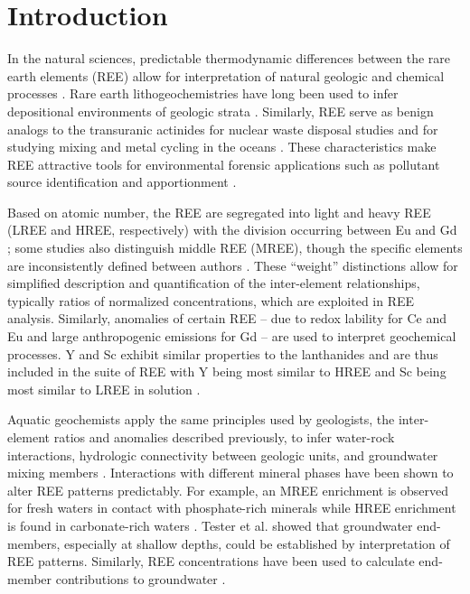 \section{Introduction}

In the natural sciences, predictable thermodynamic differences between the rare earth elements (REE) allow for interpretation of natural geologic and chemical processes \citep{REE_dep_study, REE_soil_tracers}. 
Rare earth lithogeochemistries have long been used to infer depositional environments of geologic strata \citep{REE_dep_study, PAAS, Hanson_EPS_1980}.
Similarly, REE serve as benign analogs to the transuranic actinides for nuclear waste disposal studies \citep{Krauskopf_CG_1986, Millero_GCA_1992} and for studying mixing and metal cycling in the oceans \citep{DeBaar_Nat_1983, Elderfield_PTRS_1988}.
These characteristics make REE attractive tools for environmental forensic applications such as pollutant source identification and apportionment \citep{Kulkarni_AE_2006, Kulkarni_EST_2007}.

Based on atomic number, the REE are segregated into light and heavy REE (LREE and HREE, respectively) with the division occurring between Eu and Gd \citep{Castor_Hedrick};
some studies also distinguish middle REE (MREE), though the specific elements are inconsistently defined between authors \citep{Hannigan_CG_2001, Tang_CG_2010, Choi_CG_2009, Brookins_RMG_1989}.
These ``weight'' distinctions allow for simplified description and quantification of the inter-element relationships, typically ratios of normalized concentrations, which are exploited in REE analysis.
Similarly, anomalies of certain REE -- due to redox lability for Ce and Eu \citep{Brookins_RMG_1989} and large anthropogenic emissions for Gd \citep{Bau_EPSL_1996} -- are used to interpret geochemical processes. 
Y and Sc exhibit similar properties to the lanthanides and are thus included in the suite of REE with Y being most similar to HREE and Sc being most similar to LREE in solution \citep{Brookins_RMG_1989}.
 
Aquatic geochemists apply the same principles used by geologists, the inter-element ratios and anomalies described previously, to infer water-rock interactions, hydrologic connectivity between geologic units, and groundwater mixing members \citep{Johannesson_GCA_1997, Johannesson_GW_1997, BwireOjiambo_AG_2003, Siebert_AG_2012}.
Interactions with different mineral phases have been shown to alter REE patterns predictably.
For example, an MREE enrichment is observed for fresh waters in contact with phosphate-rich minerals \citep{Hannigan_CG_2001} while HREE enrichment is found in carbonate-rich waters \citep{Johannesson_EPSL_1996}.
Tester et al. \citep{Tesmer_HJ_2007} showed that groundwater end-members, especially at shallow depths, could be established by interpretation of REE patterns.
Similarly, REE concentrations have been used to calculate end-member contributions to groundwater \citep{Johannesson_GCA_1997, BwireOjiambo_AG_2003}.
 
